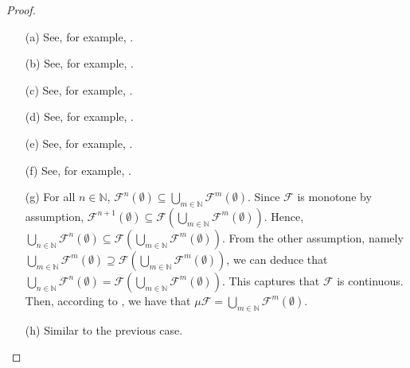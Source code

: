 \documentclass[12pt]{article}
\theoremstyle{definition}
\begin{document}
\begin{proof}\
\begin{itemize}
\item [(a)]
See, for example, \cite[Theorem~2.35]{DP02}.
\item [(b)]
See, for example, \cite[Theorem~2.35]{DP02}.
\item [(c)]
See, for example, \cite[Theorem~2.35]{DP02}.
\item [(d)]
See, for example, \cite[Theorem~2.35]{DP02}.
\item [(e)]
See, for example, \cite[Lemma~8]{CGP99}.
\item [(f)]
See, for example, \cite[Lemma~8]{CGP99}.
\item [(g)]
For all $n \in \mathbb{N}$, $\mathcal{F}^n(\emptyset) \subseteq \bigcup_{m \in \mathbb{N}} \mathcal{F}^m(\emptyset)$.  Since $\mathcal{F}$ is monotone by assumption, $\mathcal{F}^{n+1}(\emptyset) \subseteq \mathcal{F}(\bigcup_{m \in \mathbb{N}} \mathcal{F}^m(\emptyset))$.  Hence, $\bigcup_{n \in \mathbb{N}} \mathcal{F}^{n}(\emptyset) \subseteq \mathcal{F}(\bigcup_{m \in \mathbb{N}} \mathcal{F}^m(\emptyset))$.  From the other assumption, namely $\bigcup_{m \in \mathbb{N}} \mathcal{F}^m(\emptyset) \supseteq \mathcal{F}(\bigcup_{m \in \mathbb{N}} \mathcal{F}^m(\emptyset))$, we can deduce that  $\bigcup_{n \in \mathbb{N}} \mathcal{F}^{n}(\emptyset) = \mathcal{F}(\bigcup_{m \in \mathbb{N}} \mathcal{F}^m(\emptyset))$.  This captures that $\mathcal{F}$ is continuous.  Then, according to \cite[Theorem~8.15]{DP02}, we have that $\mu \mathcal{F} = \bigcup_{m \in \mathbb{N}} \mathcal{F}^m(\emptyset)$.
\item [(h)]
Similar to the previous case.
\end{itemize}
\end{proof}
\end{document}
